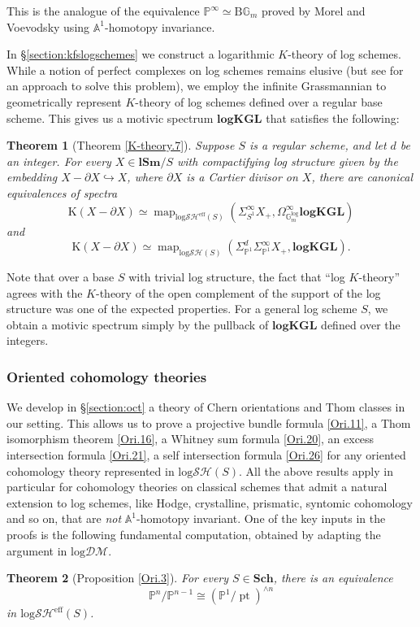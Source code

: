 \documentclass[11pt, a4paper]{amsart}
\newtheorem{thm}{Theorem}[subsection]
\theoremstyle{definition}
\numberwithin{equation}{subsection}
\renewcommand{\P}{\mathbb{P}}
\newcommand{\A}{\mathbb{A}}
\newcommand{\Sch}{\mathbf{Sch}}
\newcommand{\lSm}{\mathbf{lSm}}
\newcommand{\pt}[1]{\mathrm{\pt}_{#1}}
\newcommand{\Kth}{\mathrm{K}}
\newcommand{\logKGL}{\mathbf{logKGL}}
\newcommand{\Gmm}{\mathbb{G}_m^{\mathrm{log}}}
\def\pt{\operatorname{pt}}
\newcommand{\inflogSH}{\mathrm{log}\mathcal{SH}}
\newcommand{\inflogSHS}{\mathrm{log}\mathcal{SH}^{\mathrm{eff}}}
\newcommand{\inflogDM}{\mathrm{log}\mathcal{DM}}
\newcommand{\map}{\operatorname{map}}
\begin{document}
This is the analogue of the equivalence $\P^\infty\simeq \mathrm{B}\mathbb{G}_m$ proved by Morel and Voevodsky using $\A^1$-homotopy invariance.

In \S\ref{section:kfslogschemes} we construct a logarithmic $K$-theory of log schemes.  
While a notion of perfect complexes on log schemes remains elusive (but see \cite{BLMP} for an approach to solve this problem), 
we employ the infinite Grassmannian to geometrically represent $K$-theory of log schemes  
defined over a regular base scheme. This gives us a motivic spectrum $\logKGL$ that satisfies the following:

\begin{thm}[Theorem \ref{K-theory.7}]
Suppose $S$ is a regular scheme,
and let $d$ be an integer.
For every $X\in \lSm/S$ with compactifying log structure given by the embedding $X-\partial X \hookrightarrow X$, where $\partial X$ is a Cartier divisor on $X$,  there are canonical equivalences of spectra
\[
\Kth(X-\partial X)
\simeq
\map_{\inflogSHS(S)}(\Sigma_{S^1}^\infty X_+,\Omega_{\Gmm}^\infty \logKGL)
\]
and
\[
\Kth(X-\partial X)
\simeq
\map_{\inflogSH(S)}(\Sigma_{\P^1}^d \Sigma_{\P^1}^\infty X_+,\logKGL).
\]
\end{thm}
Note that over a base $S$ with trivial log structure, the fact that ``log $K$-theory'' agrees with the $K$-theory of the open complement of the support of the log structure was one of the expected properties.  For a general log scheme $S$, we obtain a motivic spectrum simply by the pullback of $\logKGL$ defined over the integers.

\subsubsection{Oriented cohomology theories} We develop in \S\ref{section:oct} a theory of Chern orientations and Thom classes in our setting. This allows us to prove a projective bundle formula \ref{Ori.11},
a Thom isomorphism theorem \ref{Ori.16}, a Whitney sum formula \ref{Ori.20}, an excess intersection formula \ref{Ori.21}, a self intersection formula \ref{Ori.26}  for any oriented cohomology theory represented in $\inflogSH(S)$. All the above results apply in particular for cohomology theories on classical schemes that admit a natural extension to log schemes, like Hodge, crystalline, prismatic, syntomic cohomology and so on, that are \emph{not} $\A^1$-homotopy invariant. One of the key inputs in the proofs is the following fundamental computation, obtained by adapting the argument in $\inflogDM$.
\begin{thm}[Proposition \ref{Ori.3}] For every $S\in\Sch$, there is an equivalence
\[
\P^n/\P^{n-1}
\cong
(\P^1/\pt)^{\wedge n}
\]
in $\inflogSHS(S)$.
\end{thm}
\end{document}
